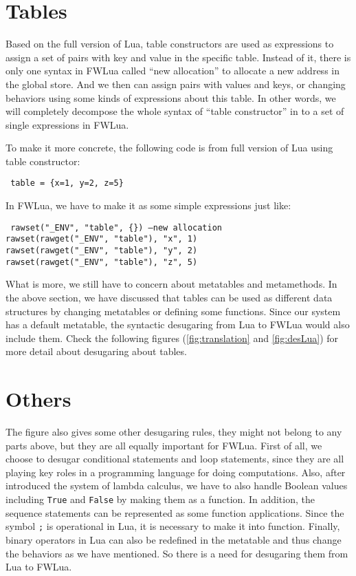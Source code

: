 \section{Tables}
Based on the full version of Lua, table constructors are used as expressions to assign a set of pairs with key and value in the specific table. Instead of it, there is only one syntax in FWLua called ``new allocation'' to allocate a new address in the global store. And we then can assign pairs with values and keys, or changing behaviors using some kinds of expressions about this table. In other words, we will completely decompose the whole syntax of ``table constructor'' in to a set of single expressions in FWLua. 

To make it more concrete, the following code is from full version of Lua using table constructor:
\begin{flushleft}
{\tt
table = \{x=1, y=2, z=5\}\\
}
\end{flushleft}
In FWLua, we have to make it as some simple expressions just like:
\begin{flushleft}
{\tt
rawset("\_ENV", "table", \{\}) --new allocation\\
rawset(rawget("\_ENV", "table"), "x", 1)\\
rawset(rawget("\_ENV", "table"), "y", 2)\\
rawset(rawget("\_ENV", "table"), "z", 5)\\
}
\end{flushleft}

What is more, we still have to concern about metatables and metamethods. In the above section, we have discussed that tables can be used as different data structures by changing metatables or defining some functions. Since our system has a default metatable, the syntactic desugaring from Lua to FWLua would also include them. Check the following figures (\ref{fig:translation} and \ref{fig:desLua}) for more detail about desugaring about tables.

\section{Others}
The figure also gives some other desugaring rules, they might not belong to any parts above, but they are all equally important for FWLua. First of all, we choose to desugar conditional statements and loop statements, since they are all playing key roles in a programming language for doing computations. Also, after introduced the system of lambda calculus, we have to also handle Boolean values including {\tt True} and {\tt False} by making them as a function. In addition, the sequence statements can be represented as some function applications. Since the symbol {\tt ;} is operational in Lua, it is necessary to make it into function. Finally, binary operators in Lua can also be redefined in the metatable and thus change the behaviors as we have mentioned. So there is a need for desugaring them from Lua to FWLua.



